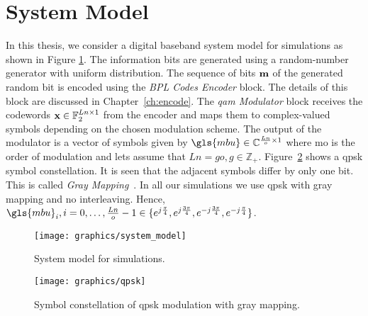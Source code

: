 \section{System Model}\label{sec:sys_mod}
In this thesis, we consider a digital baseband system model for simulations as shown in Figure \ref{fig:system}. The information bits are generated using a random-number generator with uniform distribution. The sequence of bits $\mathbf{m}$ of the generated random bit is encoded using the \emph{BPL Codes Encoder} block. The details of this block are discussed in Chapter~\ref{ch:encode}. The \emph{\gls{qam} Modulator} block receives the codewords $\mathbf{x}\in\mathbb{F}_2^{Ln\times 1}$ from the encoder and maps them to complex-valued symbols depending on the chosen modulation scheme. The output of the modulator is a vector of symbols given by $\gls{mbu}\in\mathbb{C}^{\frac{Ln}{o}\times 1}$ where \gls{mo} is the order of modulation and lets assume that $Ln=go, g\in\mathbb{Z}_+$. Figure~\ref{fig:qpsk} shows a \gls{qpsk} symbol constellation. It is seen that the adjacent symbols differ by only one bit. This is called \emph{Gray Mapping}~\cite{proak}. In all our simulations we use \gls{qpsk} with gray mapping and no interleaving. Hence, $\gls{mbu}_i,i=0,\dots,\frac{Ln}{o}-1\in\{e^{j\frac{\pi}{4}},e^{j\frac{3\pi}{4}},e^{-j\frac{3\pi}{4}},e^{-j\frac{\pi}{4}}\}$.
\begin{figure}[htbp]
  \centering
  \texttt{[image: graphics/system\_model]}
  \caption{System model for simulations.}
  \label{fig:system}
\end{figure}

\begin{figure}[htbp]
  \centering
  \texttt{[image: graphics/qpsk]}
  \caption{Symbol constellation of \gls{qpsk} modulation with gray mapping.}
  \label{fig:qpsk}
\end{figure}

